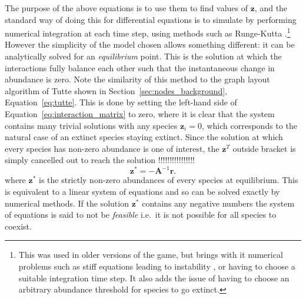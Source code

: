 The purpose of the above equations is to use them to find values of $\mathbf{z}$, and the standard way of doing this for differential equations is to simulate by performing numerical integration at each time step, using methods such as Runge-Kutta \cite{Press2007Runge}.\footnote{This was used in older versions of the game, but brings with it numerical problems such as stiff equations leading to instability \cite{Press2007Runge}, or having to choose a suitable integration time step. It also adds the issue of having to choose an arbitrary abundance threshold for species to go extinct.}
However the simplicity of the model chosen allows something different: it can be analytically solved for an \emph{equilibrium} point. This is the solution at which the interactions fully balance each other such that the instantaneous change in abundance is zero. Note the similarity of this method to the graph layout algorithm of Tutte shown in Section~\ref{sec:nodes_background}, Equation~\eqref{eq:tutte}.
This is done by setting the left-hand side of Equation~\eqref{eq:interaction_matrix} to zero, where it is clear that the system contains many trivial solutions with any species $\mathbf{z}_i=0$, which corresponds to the natural case of an extinct species staying extinct.
Since the solution at which every species has non-zero abundance is one of interest, the $\mathbf{z}^T$ outside bracket is simply cancelled out to reach the solution !!!!!!!!!!!!!!!!
\begin{equation}
  \mathbf{z^*} = -\mathbf{A}^{-1}\mathbf{r}.
  \label{eq:equilibrium}
\end{equation}
where $\mathbf{z}^*$ is the strictly non-zero abundances of every species at equilibrium.
This is equivalent to a linear system of equations and so can be solved exactly by numerical methods.
If the solution $\mathbf{z^*}$ contains any negative numbers the system of equations is said to not be \emph{feasible} i.e.\ it is not possible for all species to coexist.

